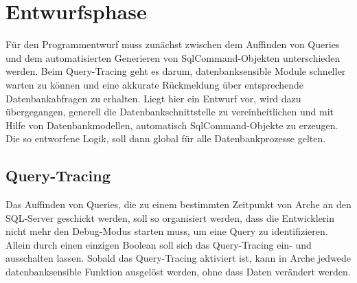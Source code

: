 \documentclass[11pt,toc=sectionentrywithoutdots, 
headheight=44pt, headings=optiontoheadandtoc, hyperfootnotes=false, hypertexnames=false]{scrartcl}
\begin{document}
\section{Entwurfsphase}
Für den Programmentwurf muss zunächst zwischen dem Auffinden von Queries und dem automatisierten Generieren von \gls{SqlCommand}-Objekten unterschieden werden. Beim Query-Tracing geht es darum, datenbanksensible Module schneller warten zu können und eine akkurate Rückmeldung über entsprechende Datenbankabfragen zu erhalten. Liegt hier ein Entwurf vor, wird dazu übergegangen, generell die Datenbankschnittstelle zu vereinheitlichen und mit Hilfe von Datenbankmodellen, automatisch SqlCommand-Objekte zu erzeugen. Die so entworfene Logik, soll dann global für alle Datenbankprozesse gelten.

\subsection{Query-Tracing}
Das Auffinden von Queries, die zu einem bestimmten Zeitpunkt von Arche an den SQL-Server geschickt werden, soll so organisiert werden, dass die Entwicklerin nicht mehr den Debug-Modus starten muss, um eine Query zu identifizieren. Allein durch einen einzigen Boolean soll sich das Query-Tracing ein- und ausschalten lassen. Sobald das Query-Tracing aktiviert ist, kann in Arche jedwede datenbanksensible Funktion ausgelöst werden, ohne dass Daten verändert werden. 
\end{document}
